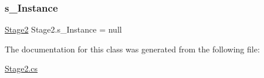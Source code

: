\mbox{\label{class_stage2_ab0b9069fe51d69bfbe6b847dccd5dbd4}} 
\subsubsection{\texorpdfstring{s\+\_\+\+Instance}{s\_Instance}}
{\footnotesize\ttfamily \mbox{\hyperlink{class_stage2}{Stage2}} Stage2.\+s\+\_\+\+Instance = null\hspace{0.3cm}{\ttfamily [static]}}



The documentation for this class was generated from the following file\+:\begin{DoxyCompactItemize}
\item 
\mbox{\hyperlink{_stage2_8cs}{Stage2.\+cs}}\end{DoxyCompactItemize}
